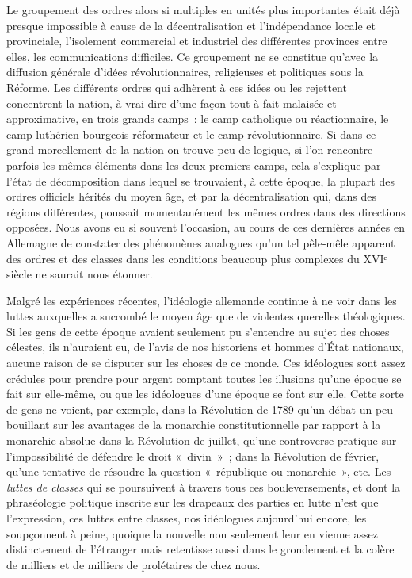 \documentclass[french,twoside]{book} %
\newcommand\chaptercont{} %
\begin{document}
\chaptercont
\noindent Le groupement des ordres alors si multiples en unités plus importantes était déjà presque impossible à cause de la décentralisation et l’indépendance locale et provinciale, l’isolement commercial et industriel des différentes provinces entre elles, les communications difficiles. Ce groupement ne se constitue qu’avec la diffusion générale d’idées révolutionnaires, religieuses et politiques sous la Réforme. Les différents ordres qui adhèrent à ces idées ou les rejettent concentrent la nation, à vrai dire d’une façon tout à fait malaisée et approximative, en trois grands camps : le camp catholique ou réactionnaire, le camp luthérien bourgeois-réformateur et le camp révolutionnaire. Si dans ce grand morcellement de la nation on trouve peu de logique, si l’on rencontre parfois les mêmes éléments dans les deux premiers camps, cela s’explique par l’état de décomposition dans lequel se trouvaient, à cette époque, la plupart des ordres officiels hérités du moyen âge, et par la décentralisation qui, dans des régions différentes, poussait momentanément les mêmes ordres dans des directions opposées. Nous avons eu si souvent l’occasion, au cours de ces dernières années en Allemagne de constater des phénomènes analogues qu’un tel pêle-mêle apparent des ordres et des classes dans les conditions beaucoup plus complexes du XVIᵉ siècle ne saurait nous étonner.\par
Malgré les expériences récentes, l’idéologie allemande continue à ne voir dans les luttes auxquelles a succombé le moyen âge que de violentes querelles théologiques. Si les gens de cette époque avaient seulement pu s’entendre au sujet des choses célestes, ils n’auraient eu, de l’avis de nos historiens et hommes d’État nationaux, aucune raison de se disputer sur les choses de ce monde. Ces idéologues sont assez crédules pour prendre pour argent comptant toutes les illusions qu’une époque se fait sur elle-même, ou que les idéologues d’une époque se font sur elle. Cette sorte de gens ne voient, par exemple, dans la Révolution de 1789 qu’un débat un peu bouillant sur les avantages de la monarchie constitutionnelle par rapport à la monarchie absolue dans la Révolution de juillet, qu’une controverse pratique sur l’impossibilité de défendre le droit « divin » ; dans la Révolution de février, qu’une tentative de résoudre la question « république ou monarchie », etc. Les \emph{luttes de classes} qui se poursuivent à travers tous ces bouleversements, et dont la phraséologie politique inscrite sur les drapeaux des parties en lutte n’est que l’expression, ces luttes entre classes, nos idéologues aujourd’hui encore, les soupçonnent à peine, quoique la nouvelle non seulement leur en vienne assez distinctement de l’étranger mais retentisse aussi dans le grondement et la colère de milliers et de milliers de prolétaires de chez nous.\par
\end{document}
